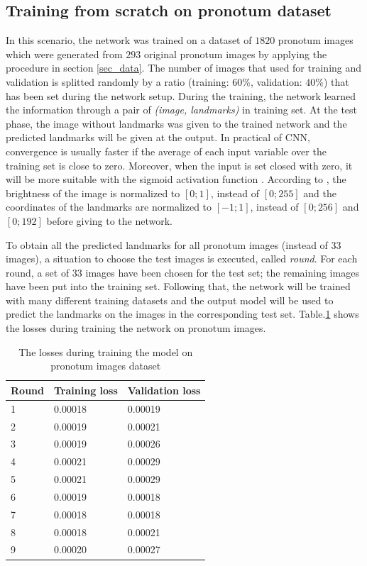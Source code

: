 \documentclass[10pt]{article}
\begin{document}
\subsection{Training from scratch on pronotum dataset}
\label{sectrain1}
In this scenario, the network was trained on a dataset of $1820$ pronotum images which were generated from $293$ original pronotum images by applying the procedure in section \ref{sec_data}. The number of images that
used for training and validation is splitted randomly by a ratio
(training: $60\%$, validation: $40\%$) that has been set during the
network setup. During the training, the network learned the information through a pair of \textit{(image, landmarks)} in training set. At the test phase, the image without landmarks was given to the trained network and the predicted landmarks will be given at the output. In practical of CNN, convergence is
usually faster if the average of each input variable over the
training set is close to zero. Moreover, when the input is set
closed with zero, it will be more suitable with the sigmoid
activation function \cite{lecun2012efficient}. According to \cite{lecun2012efficient}, the brightness of
the image is normalized to $[0; 1]$, instead of $[0; 255]$ and the
coordinates of the landmarks are normalized to $[-1; 1]$, instead
of $[0; 256]$ and $[0; 192]$ before giving to the network.



To obtain all the predicted landmarks for all pronotum images (instead of $33$ images), a situation to choose the test images is executed, called \textit{round}. For each round, a set of 33 images have been chosen for the test set; the remaining images have been put into the training set. Following that, the network will be trained with many different training datasets and the output model will be used to predict the landmarks on the images in the corresponding test set. Table.\ref{tbltrainingloss} shows the losses during training the network on pronotum images.

\begin{table}[h!]
	\centering
	\begin{tabular}{l l l}
	Round & Training loss & Validation loss \\ \hline
	1 & 0.00018 & 0.00019  \\ \hline
	2 & 0.00019 & 0.00021 \\ \hline
	3 & 0.00019 & 0.00026 \\ \hline
	4 & 0.00021 & 0.00029 \\ \hline
	5 & 0.00021 & 0.00029 \\ \hline
	6 & 0.00019 & 0.00018 \\ \hline
	7 & 0.00018 & 0.00018 \\ \hline
	8 & 0.00018 & 0.00021 \\ \hline
	9 & 0.00020 & 0.00027 \\ \hline
	\end{tabular}
	\caption{The losses during training the model on pronotum images dataset}
	\label{tbltrainingloss}
\end{table}
\end{document}
